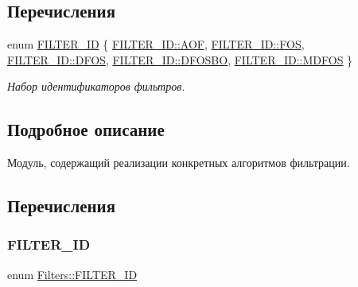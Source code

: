 \subsection*{Перечисления}
\begin{DoxyCompactItemize}
\item 
enum \hyperlink{namespace_filters_a1b615faac44ef992d0af44da40ff26d7}{F\+I\+L\+T\+E\+R\+\_\+\+ID} \{ \newline
\hyperlink{namespace_filters_a1b615faac44ef992d0af44da40ff26d7afb2e0194a4c38c00b93fb1222c7df34a}{F\+I\+L\+T\+E\+R\+\_\+\+I\+D\+::\+A\+OF}, 
\hyperlink{namespace_filters_a1b615faac44ef992d0af44da40ff26d7a12afbc0c8b3d0ec4d03bb3254eec87a0}{F\+I\+L\+T\+E\+R\+\_\+\+I\+D\+::\+F\+OS}, 
\hyperlink{namespace_filters_a1b615faac44ef992d0af44da40ff26d7a7d07d86f2caba0db54a7b3464451b0aa}{F\+I\+L\+T\+E\+R\+\_\+\+I\+D\+::\+D\+F\+OS}, 
\hyperlink{namespace_filters_a1b615faac44ef992d0af44da40ff26d7acbecfce9d58e9013e109cbe14047e9df}{F\+I\+L\+T\+E\+R\+\_\+\+I\+D\+::\+D\+F\+O\+S\+BO}, 
\newline
\hyperlink{namespace_filters_a1b615faac44ef992d0af44da40ff26d7a2c5a562dbfb4545d3fb7270a36bdfcc2}{F\+I\+L\+T\+E\+R\+\_\+\+I\+D\+::\+M\+D\+F\+OS}
 \}\begin{DoxyCompactList}\small\item\em Набор идентификаторов фильтров. \end{DoxyCompactList}
\end{DoxyCompactItemize}


\subsection{Подробное описание}
Модуль, содержащий реализации конкретных алгоритмов фильтрации. 

\subsection{Перечисления}
\hypertarget{namespace_filters_a1b615faac44ef992d0af44da40ff26d7}{}\label{namespace_filters_a1b615faac44ef992d0af44da40ff26d7} 
\subsubsection{\texorpdfstring{F\+I\+L\+T\+E\+R\+\_\+\+ID}{FILTER\_ID}}
{\footnotesize\ttfamily enum \hyperlink{namespace_filters_a1b615faac44ef992d0af44da40ff26d7}{Filters\+::\+F\+I\+L\+T\+E\+R\+\_\+\+ID}\hspace{0.3cm}{\ttfamily [strong]}}



